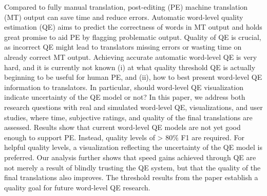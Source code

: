 Compared to fully manual translation, post-editing (PE) machine translation (MT) output can save time and reduce errors. Automatic word-level quality estimation (QE) aims to predict the correctness of words in MT output and holds great promise to aid PE by flagging problematic output. Quality of QE is crucial, as incorrect QE might lead to translators missing errors or wasting time on already correct MT output. Achieving accurate automatic word-level QE is very hard, and it is currently not known (i) at what quality threshold QE is actually beginning to be useful for human PE, and (ii), how to best present word-level QE information to translators. In particular, should word-level QE visualization indicate uncertainty of the QE model or not? In this paper, we address both research questions with real and simulated word-level QE, visualizations, and user studies, where time, subjective ratings, and quality of the final translations are assessed. Results show that current word-level QE models are not yet good enough to support PE. Instead, quality levels of > 80\% F1 are required. For helpful quality levels, a visualization reflecting the uncertainty of the QE model is preferred. Our analysis further shows that speed gains achieved through QE are not merely a result of blindly trusting the QE system, but that the quality of the final translations also improves. The threshold results from the paper establish a quality goal for future word-level QE research.
